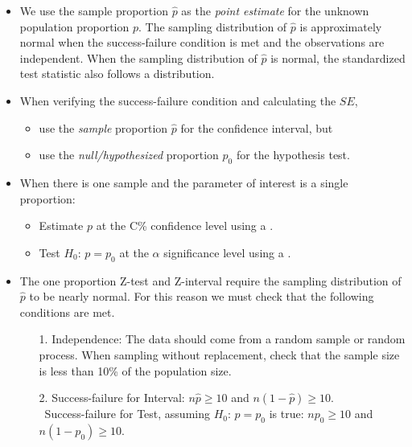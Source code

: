 \begin{itemize} 

\item We use the sample proportion $\hat{p}$ as the \emph{point estimate} for the unknown population proportion $p$. The sampling distribution of $\hat{p}$ is approximately normal when the success-failure condition is met and the observations are independent.  When the sampling distribution of $\hat{p}$ is normal, the standardized test statistic also follows a  distribution.

\item When verifying the success-failure condition and calculating the $SE$, \vspace{-1mm}
\begin{itemize}
\setlength{\itemsep}{0mm}
\item use the \emph{sample} proportion $\hat{p}$ for the confidence interval, but 
\item use the \emph{null/hypothesized} proportion $p_0$ for the hypothesis test.
\end{itemize}

\item When there is one sample and the parameter of interest is a single proportion:\begin{itemize}
 \item Estimate $p$ at the C\% confidence level using a .
\item Test $H_0$: $p=p_0$ at the $\alpha$ significance level using a .
\end{itemize}

\item The one proportion Z-test and Z-interval require the sampling distribution of $\hat{p}$ to be nearly normal.  For this reason we must check that the following conditions are met.
\begin{itemize}
\item[1.] Independence:  The data should come from a random sample or random process.  When sampling without replacement, check that the sample size is less than 10\% of the population size.
\item[2.] Success-failure for Interval:  $n\hat{p}\ge 10$ and $n(1-\hat{p})\ge 10$.   \\\
Success-failure for Test, assuming $H_0$: $p=p_0$ is true: $np_0\ge 10$ and $n(1-p_0)\ge 10$.
\end{itemize}



\end{itemize}
